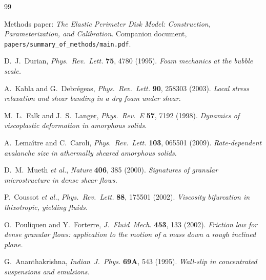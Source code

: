\documentclass[aps,pre,twocolumn,floatfix,longbibliography]{revtex4-2}
\begin{document}

\begin{thebibliography}{99}

Methods paper: \emph{The Elastic Perimeter Disk Model: Construction,
Parameterization, and Calibration}.  Companion document,
\texttt{papers/summary\_of\_methods/main.pdf}.

D.~J.~Durian, \emph{Phys.~Rev.~Lett.} \textbf{75}, 4780 (1995).
\emph{Foam mechanics at the bubble scale.}

A.~Kabla and G.~Debrégeas, \emph{Phys.~Rev.~Lett.} \textbf{90},
258303 (2003). \emph{Local stress relaxation and shear banding
in a dry foam under shear.}

M.~L.~Falk and J.~S.~Langer, \emph{Phys.~Rev.~E} \textbf{57}, 7192
(1998). \emph{Dynamics of viscoplastic deformation in amorphous
solids.}

A.~Lemaître and C.~Caroli, \emph{Phys.~Rev.~Lett.} \textbf{103},
065501 (2009). \emph{Rate-dependent avalanche size in
athermally sheared amorphous solids.}

D.~M.~Mueth \emph{et al.}, \emph{Nature} \textbf{406}, 385 (2000).
\emph{Signatures of granular microstructure in dense shear flows.}

P.~Coussot \emph{et al.}, \emph{Phys.~Rev.~Lett.} \textbf{88},
175501 (2002). \emph{Viscosity bifurcation in thixotropic,
yielding fluids.}

O.~Pouliquen and Y.~Forterre, \emph{J.~Fluid~Mech.} \textbf{453},
133 (2002). \emph{Friction law for dense granular flows:
application to the motion of a mass down a rough inclined plane.}

G.~Ananthakrishna, \emph{Indian~J.~Phys.} \textbf{69A}, 543 (1995).
\emph{Wall-slip in concentrated suspensions and emulsions.}

\end{thebibliography}
\end{document}
